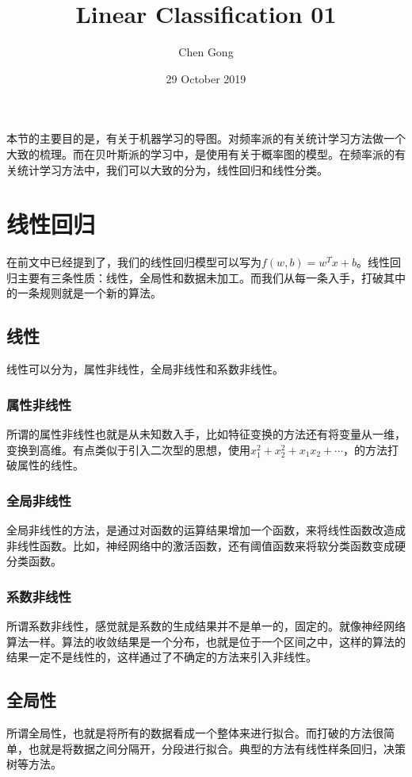 \documentclass[a4paper]{article}
\title{Linear Classification 01}
\author{Chen Gong}
\date{29 October 2019}
\begin{document}
\maketitle

本节的主要目的是，有关于机器学习的导图。对频率派的有关统计学习方法做一个大致的梳理。而在贝叶斯派的学习中，是使用有关于概率图的模型。在频率派的有关统计学习方法中，我们可以大致的分为，线性回归和线性分类。

\section{线性回归}
在前文中已经提到了，我们的线性回归模型可以写为$f(w,b)=w^Tx+b$。线性回归主要有三条性质：线性，全局性和数据未加工。而我们从每一条入手，打破其中的一条规则就是一个新的算法。

\subsection{线性}
线性可以分为，属性非线性，全局非线性和系数非线性。

\subsubsection{属性非线性}
所谓的属性非线性也就是从未知数入手，比如特征变换的方法还有将变量从一维，变换到高维。有点类似于引入二次型的思想，使用$x_1^2+x_2^2+x_1x_2+\cdots$，的方法打破属性的线性。

\subsubsection{全局非线性}
全局非线性的方法，是通过对函数的运算结果增加一个函数，来将线性函数改造成非线性函数。比如，神经网络中的激活函数，还有阈值函数来将软分类函数变成硬分类函数。

\subsubsection{系数非线性}
所谓系数非线性，感觉就是系数的生成结果并不是单一的，固定的。就像神经网络算法一样。算法的收敛结果是一个分布，也就是位于一个区间之中，这样的算法的结果一定不是线性的，这样通过了不确定的方法来引入非线性。

\subsection{全局性}
所谓全局性，也就是将所有的数据看成一个整体来进行拟合。而打破的方法很简单，也就是将数据之间分隔开，分段进行拟合。典型的方法有线性样条回归，决策树等方法。
\end{document}
